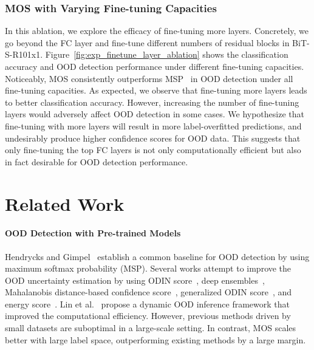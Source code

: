 \documentclass[final]{cvpr}
\begin{document}
\subsubsection{MOS with Varying Fine-tuning Capacities}
\label{sec:finetune_ablation}
\vspace{-0.2cm}
In this ablation, we explore the efficacy of fine-tuning more layers. Concretely, we go beyond the FC layer and fine-tune different numbers of residual blocks in BiT-S-R101x1. Figure~\ref{fig:exp_finetune_layer_ablation} shows the classification accuracy and OOD detection performance under different fine-tuning capacities. Noticeably, MOS consistently outperforms MSP~\cite{hendrycks2016baseline} in OOD detection under all fine-tuning capacities. As expected, we observe that fine-tuning more layers leads to better classification accuracy. However, increasing the number of fine-tuning layers would adversely affect OOD detection in some cases.
We hypothesize that fine-tuning with more layers will result in more label-overfitted predictions, and undesirably produce higher confidence scores for OOD data. This suggests that only fine-tuning the top FC layers is not only computationally efficient but also in fact desirable for OOD detection performance. 









\section{Related Work}

\paragraph{OOD Detection with Pre-trained Models} Hendrycks and Gimpel~\cite{hendrycks2016baseline} establish a common baseline for OOD detection by using maximum softmax probability (MSP). Several works attempt to improve the OOD uncertainty estimation by using ODIN score~\cite{liang2018enhancing}, deep ensembles~\cite{lakshminarayanan2017simple}, Mahalanobis distance-based confidence score~\cite{lee2018simple}, generalized ODIN score~\cite{hsu2020generalized}, and energy score~\cite{liu2020energy}. Lin et al.~\cite{lin2021mood} propose a dynamic OOD inference framework that improved the computational efficiency. However, previous methods driven by small datasets are  suboptimal  in a large-scale setting. In contrast, MOS scales better with large label space, outperforming existing methods by a large margin.
\end{document}
